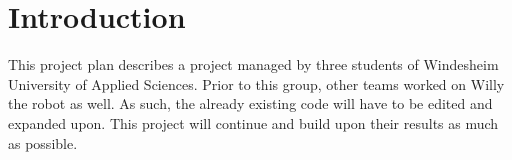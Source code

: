\section{Introduction}
This project plan describes a project managed by three students of Windesheim University of Applied Sciences. 
Prior to this group, other teams worked on Willy the robot as well. As such, the already existing code will have to be edited and expanded upon. 
This project will continue and build upon their results as much as possible. 

\newpage
